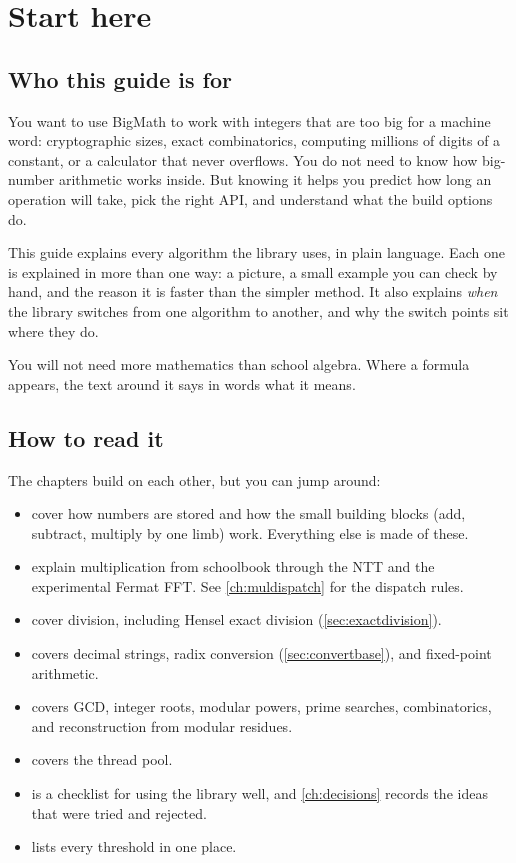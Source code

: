 \chapter{Start here}
\label{ch:start}

\section{Who this guide is for}

You want to use BigMath to work with integers that are too big for a machine word:
cryptographic sizes, exact combinatorics, computing millions of digits of a constant,
or a calculator that never overflows. You do not need to know how big-number
arithmetic works inside. But knowing it helps you predict how long an operation will
take, pick the right API, and understand what the build options do.

This guide explains every algorithm the library uses, in plain language. Each one is
explained in more than one way: a picture, a small example you can check by hand,
and the reason it is faster than the simpler method. It also explains \emph{when} the
library switches from one algorithm to another, and why the switch points sit where
they do.

You will not need more mathematics than school algebra. Where a formula appears, the
text around it says in words what it means.

\section{How to read it}

The chapters build on each other, but you can jump around:

\begin{itemize}
  \item {} cover how numbers are stored and how the small
        building blocks (add, subtract, multiply by one limb) work. Everything
        else is made of these.
  \item {} explain multiplication from schoolbook
        through the NTT and the experimental Fermat FFT. See \cref{ch:muldispatch}
        for the dispatch rules.
  \item {} cover division, including
        Hensel exact division (\cref{sec:exactdivision}).
  \item {} covers decimal strings, radix conversion (\cref{sec:convertbase}),
        and fixed-point arithmetic.
  \item {} covers GCD, integer roots, modular powers, prime
        searches, combinatorics, and reconstruction from modular residues.
  \item {} covers the thread pool.
  \item {} is a checklist for using the library well, and
        \cref{ch:decisions} records the ideas that were tried and rejected.
  \item {} lists every threshold in one place.
\end{itemize}


